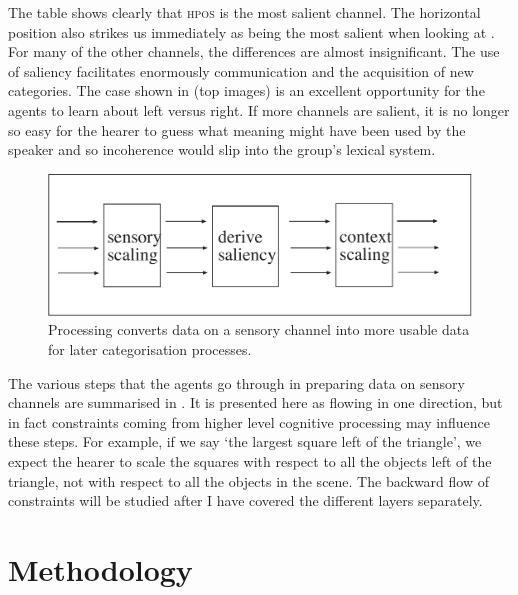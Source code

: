 The table shows clearly that \textsc{hpos} is the most salient channel. 
The horizontal position also strikes us immediately 
as being the most salient when looking at  . 
For many of the other channels, the differences are
almost insignificant. The use of saliency facilitates 
enormously communication and the acquisition of new categories. 
The case shown in  (top images) is an excellent opportunity 
for the agents to learn about left versus right. If more 
channels are salient, it is no longer so easy for the 
hearer to guess what meaning might have been used by the 
speaker and so incoherence would slip into the group's lexical
system. 

\begin{figure}[t]
  \centerline{\includegraphics[width=.65\textwidth]{chap3/figs/scaling.pdf}}
\caption{\label{scaling}Processing converts data on 
a sensory channel into more usable data for later categorisation processes.}
\end{figure}

The various steps that the agents go through
in preparing data on sensory channels are summarised in .
It is presented here as flowing in one direction, but in fact 
constraints coming from higher level cognitive processing may 
influence these steps. For example, if we say `the largest square 
left of the triangle', we expect the hearer to scale the squares
with respect to all the objects left of the triangle, not with 
respect to all the objects in the scene. The backward flow of 
constraints will be studied after I have covered the different 
layers separately. 

\section{Methodology}

